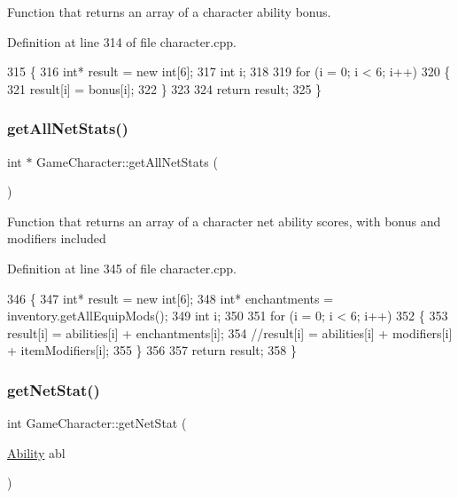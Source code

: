 Function that returns an array of a character ability bonus. 

Definition at line 314 of file character.\+cpp.


\begin{DoxyCode}
315 \{
316     \textcolor{keywordtype}{int}* result = \textcolor{keyword}{new} \textcolor{keywordtype}{int}[6];
317     \textcolor{keywordtype}{int} i;
318 
319     \textcolor{keywordflow}{for} (i = 0; i < 6; i++)
320     \{
321         result[i] = bonus[i];
322     \}
323 
324     \textcolor{keywordflow}{return} result;
325 \}
\end{DoxyCode}
\hypertarget{class_game_character_ab70746cb0cd382cbe56c0190a03a3024}{}\label{class_game_character_ab70746cb0cd382cbe56c0190a03a3024} 
\subsubsection{\texorpdfstring{get\+All\+Net\+Stats()}{getAllNetStats()}}
{\footnotesize\ttfamily int $\ast$ Game\+Character\+::get\+All\+Net\+Stats (\begin{DoxyParamCaption}{ }\end{DoxyParamCaption})}

Function that returns an array of a character net ability scores, with bonus and modifiers included 

Definition at line 345 of file character.\+cpp.


\begin{DoxyCode}
346 \{
347     \textcolor{keywordtype}{int}* result = \textcolor{keyword}{new} \textcolor{keywordtype}{int}[6];
348     \textcolor{keywordtype}{int}* enchantments = inventory.getAllEquipMods();
349     \textcolor{keywordtype}{int} i;
350 
351     \textcolor{keywordflow}{for} (i = 0; i < 6; i++)
352     \{
353         result[i] = abilities[i] + enchantments[i];
354         \textcolor{comment}{//result[i] = abilities[i] + modifiers[i] + itemModifiers[i];}
355     \}
356 
357     \textcolor{keywordflow}{return} result;
358 \}
\end{DoxyCode}
\hypertarget{class_game_character_a94e6371f4f2f14c6a9e6aa9c8e78775b}{}\label{class_game_character_a94e6371f4f2f14c6a9e6aa9c8e78775b} 
\subsubsection{\texorpdfstring{get\+Net\+Stat()}{getNetStat()}}
{\footnotesize\ttfamily int Game\+Character\+::get\+Net\+Stat (\begin{DoxyParamCaption}\item[{\hyperlink{class_ability}{Ability}}]{abl }\end{DoxyParamCaption})}

